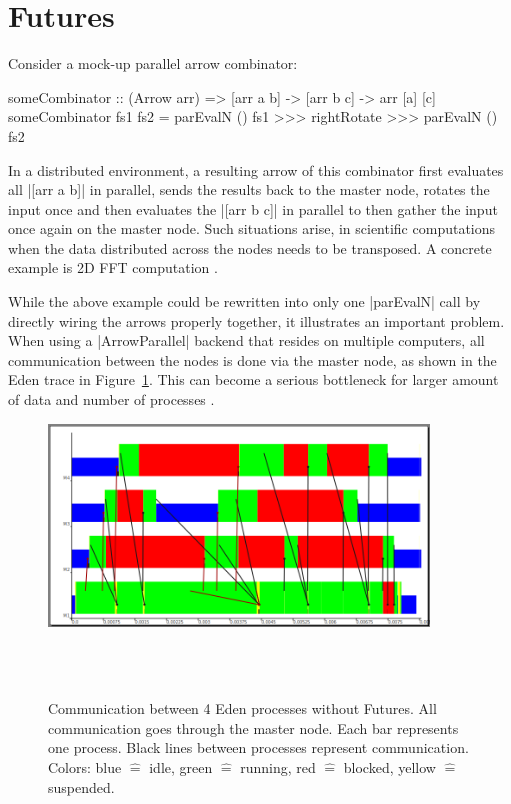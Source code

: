 \section{Futures} \label{futures}
Consider a mock-up parallel arrow combinator:
\begin{code}
someCombinator :: (Arrow arr) => [arr a b] -> [arr b c] -> arr [a] [c]
someCombinator fs1 fs2 = parEvalN () fs1 >>> rightRotate >>> parEvalN () fs2
\end{code}

In a distributed environment, a resulting arrow of this combinator first evaluates all |[arr a b]| in parallel, sends the results back to the master node, rotates the input once and then evaluates the |[arr b c]| in parallel to then gather the input once again on the master node.
Such situations arise, \eg in scientific computations when the data distributed across the nodes needs to be transposed. A concrete example is 2D FFT computation \cite{Gorlatch,Berthold2009-fft}.

While the above example could be rewritten into only one |parEvalN| call by directly wiring the arrows properly together, it illustrates an important problem. When using a |ArrowParallel| backend that resides on multiple computers, all communication between the nodes is done via the master node, as shown in the Eden trace in Figure~\ref{fig:withoutFutures}. This can become a serious bottleneck %
for larger amount of data and number of processes \citep[as \eg][showcases]{Berthold2009-fft}.
\begin{figure}[ht]
	\centering
	\includegraphics[width=0.9\textwidth]{images/withoutFutures}
	\caption[without Futures]{Communication between 4 Eden processes without Futures. All communication goes through the master node. Each bar represents one process. Black lines between processes represent communication. Colors: blue $\hat{=}$ idle, green $\hat{=}$ running, red  $\hat{=}$ blocked, yellow $\hat{=}$ suspended.}
	\label{fig:withoutFutures}
\\
\\
\end{figure}

